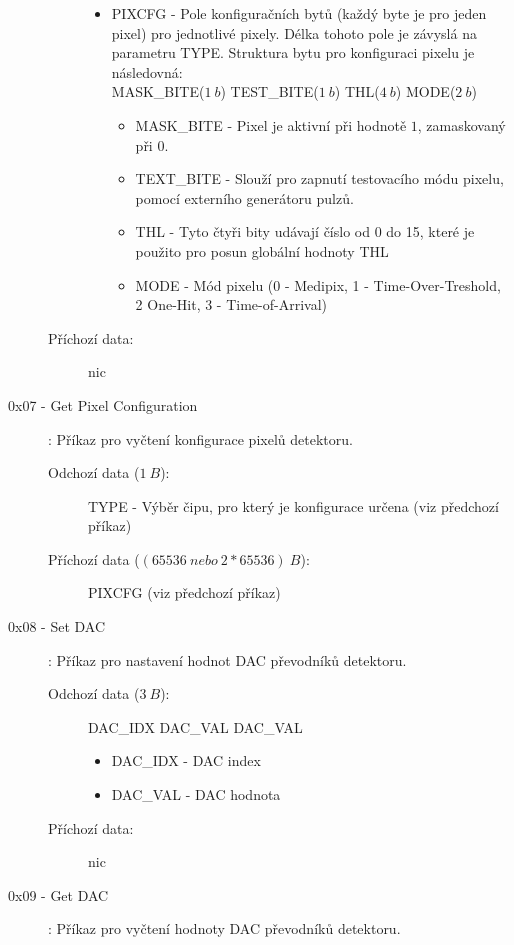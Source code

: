 \begin{description}
\begin{description}
\begin{itemize}
\begin{itemize}
						\end{itemize}
					\item PIXCFG - Pole konfiguračních bytů (každý byte je pro jeden pixel) pro jednotlivé pixely. Délka tohoto pole je závyslá na parametru TYPE. Struktura bytu pro konfiguraci pixelu je následovná: \\ MASK\_BITE($1~b$) TEST\_BITE($1~b$) THL($4~b$) MODE($2~b$)
						\begin{itemize}
							\item MASK\_BITE - Pixel je aktivní při hodnotě $1$, zamaskovaný při $0$.
							\item TEXT\_BITE - Slouží pro zapnutí testovacího módu pixelu, pomocí externího generátoru pulzů.
							\item THL - Tyto čtyři bity udávají číslo od 0 do 15, které je použito pro posun globální hodnoty THL
							\item MODE - Mód pixelu (0 - Medipix, 1 - Time-Over-Treshold, 2 One-Hit, 3 - Time-of-Arrival)
						\end{itemize}
				\end{itemize}
			\item[Příchozí data:] nic
		\end{description}
	\item[0x07 - Get Pixel Configuration]:
		Příkaz pro vyčtení konfigurace pixelů detektoru.
		\begin{description}
			\item[Odchozí data ($1~B$):] TYPE - Výběr čipu, pro který je konfigurace určena (viz předchozí příkaz)
			\item[Příchozí data ($(65536~nebo~2*65536)~B$):] PIXCFG (viz předchozí příkaz)
		\end{description}
	\item[0x08 - Set DAC]:
		Příkaz pro nastavení hodnot DAC převodníků detektoru.
		\begin{description}
			\item[Odchozí data ($3~B$):] DAC\_IDX DAC\_VAL DAC\_VAL
				\begin{itemize}
					\item DAC\_IDX - DAC index
					\item DAC\_VAL - DAC hodnota
				\end{itemize}
			\item[Příchozí data:] nic
		\end{description}
	\item[0x09 - Get DAC]:
		Příkaz pro vyčtení hodnoty DAC převodníků detektoru.
		\begin{description}

\end{description}
\end{description}
